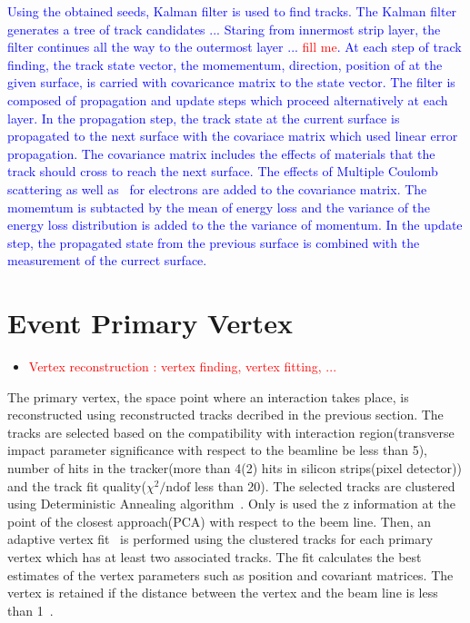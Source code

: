 \textcolor{blue}{ 
Using the obtained seeds, Kalman filter \cite{} is used to find tracks. 
The Kalman filter generates a tree of track candidates ... 
Staring from innermost strip layer, the filter continues all the way to the 
outermost layer ... \textcolor{red}{fill me}.
At each step of track finding, the track state vector, 
the momementum, direction, position of at the given surface, is carried 
with covaricance matrix to the state vector. 
The filter is composed of propagation and update steps which proceed 
alternatively at each layer. In the propagation step, the track state 
at the current surface is propagated to the next surface with the covariace 
matrix which used linear error propagation. The covariance matrix includes 
the effects of materials that the track should cross to reach the next surface. 
The effects of Multiple Coulomb scattering as well as \brem\ for electrons 
are added to the covariance matrix. The momemtum is subtacted by the mean of energy 
loss and the variance of the energy loss distribution is added to the the variance 
of momentum.  In the update step, the propagated state from the previous surface 
is combined with the measurement of the currect surface. 
}


\section{ Event Primary Vertex }
\begin{itemize}
\item \textcolor{red}{Vertex reconstruction : vertex finding, vertex fitting, ...}
\end{itemize}


The primary vertex, the space point where an interaction takes place,
is reconstructed using reconstructed tracks decribed in the previous section. 
The tracks are selected based on the compatibility with interaction 
region(transverse impact parameter significance with respect to the beamline be less than 5), 
number of hits in the tracker(more than 4(2) hits in silicon strips(pixel detector)) 
and the track fit quality($\chi^2/\textrm{ndof}$ less than 20).
The selected tracks are clustered using Deterministic Annealing algorithm~\cite{DAclustering}.
Only is used the z information at the point of the closest approach(PCA) with 
respect to the beem line. 
Then, an adaptive vertex fit~\cite{AdaptiveVertexFit} is performed using the clustered tracks 
for each primary vertex
which has at least two associated tracks. The fit calculates the best estimates 
of the vertex parameters such as position and covariant matrices. 
The vertex is retained if the distance between the vertex and the beam line 
is less than 1~\cm.

